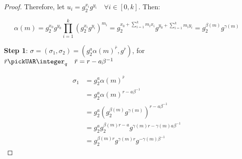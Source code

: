 \begin{proof}
    Therefore, let $u_i = g_2^{x_i}g^{y_i} \quad \forall i \in [0, k]$. Then:

    \begin{equation*}
        \alpha(m) = g_2^{x_0}g^{y_0} \prod_{i=1}^k (g_2^{x_i}g^{y_i})^{m_i} = g_2^{x_0+\sum_{i=1}^k m_ix_i}g^{y_0+\sum_{i=1}^k m_iy_i} = g_2^{\beta(m)}g^{\gamma(m)}
    \end{equation*}


    \textbf{Step 1}: $\sigma = (\sigma_1, \sigma_2) = (g_2^a \alpha(m)^{\bar{r}}, g^{\bar{r}})$, for $\bar{r} \pickUAR \integer_q \quad \bar{r} = r - a\beta^{-1}$

    \begin{align*}
        \sigma_1 &= g_2^a\alpha(m)^{\bar{r}} \\
        &= g_2^a\alpha(m)^{r - a\beta^{-1}} \\
        &= g_2^a (g_2^{\beta(m)} g^{\gamma(m)})^{r - a\beta^{-1}} \\
        &= g_2^a g_2^{\beta(m)r-a} g^{\gamma(m)r - \gamma(m)a\beta^{-1}} \\
        &= g_2^{\beta(m)r} g^{\gamma(m)r} g^{-\gamma(m)\beta^{-1}}
    \end{align*}

\end{proof}


